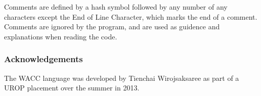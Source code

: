 \documentclass[a4paper]{article}
\theoremstyle{definition}
\begin{document}
Comments are defined by a hash symbol followed by any number of any characters except the End of Line Character,
which marks the end of a comment. Comments are ignored by the program, and are used as guidence and explanations when reading
the code.


\subsubsection*{Acknowledgements}
The WACC language was developed by Tienchai Wirojsaksaree as part of a UROP placement over the summer in 2013.

\end{document}
